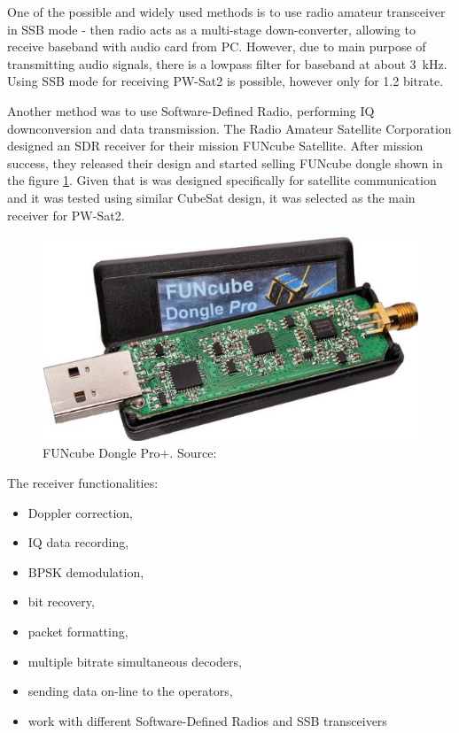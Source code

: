 One of the possible and widely used methods is to use radio amateur transceiver in SSB mode - then radio acts as a multi-stage down-converter, allowing to receive baseband with audio card from PC. However, due to main purpose of transmitting audio signals, there is a lowpass filter for baseband at about \SI{3}{\kHz}. Using SSB mode for receiving PW-Sat2 is possible, however only for \SI{1.2}{\kbps} bitrate.

Another method was to use Software-Defined Radio, performing IQ downconversion and data transmission. The Radio Amateur Satellite Corporation designed an SDR receiver for their mission FUNcube Satellite. After mission success, they released their design and started selling FUNcube dongle shown in the figure \ref{funcube_pic}. Given that is was designed specifically for satellite communication and it was tested using similar CubeSat design, it was selected as the main receiver for PW-Sat2.

\begin{figure}
    \centering
    \includegraphics[width=0.6\paperwidth]{img/4/funcube.jpg}
    \caption{FUNcube Dongle Pro+. Source: \cite{funcube}}
    \label{funcube_pic}
\end{figure}

The receiver  functionalities:
\begin{itemize}
    \item Doppler correction,
    \item IQ data recording,
    \item BPSK demodulation,
    \item bit recovery,
    \item packet formatting,
    \item multiple bitrate simultaneous decoders,
    \item sending data on-line to the operators,
    \item work with different Software-Defined Radios and SSB transceivers
\end{itemize}

